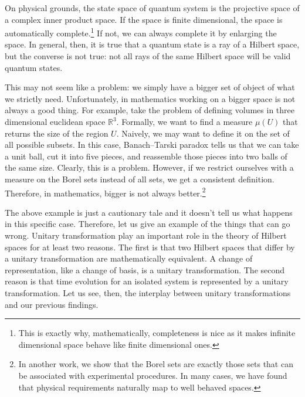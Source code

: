 \documentclass[10pt,twocolumn, nofootinbib]{revtex4-2}
\begin{document}
On physical grounds, the state space of quantum system is the projective space of a complex inner product space. If the space is finite dimensional, the space is automatically complete.\footnote{This is exactly why, mathematically, completeness is nice as it makes infinite dimensional space behave like finite dimensional ones.} If not, we can always complete it by enlarging the space. In general, then, it is true that a quantum state is a ray of a Hilbert space, but the converse is not true: not all rays of the same Hilbert space will be valid quantum states.

This may not seem like a problem: we simply have a bigger set of object of what we strictly need. Unfortunately, in mathematics working on a bigger space is not always a good thing. For example, take the problem of defining volumes in three dimensional euclidean space $\mathbb{R}^3$. Formally, we want to find a measure $\mu(U)$ that returns the size of the region $U$. Naively, we may want to define it on the set of all possible subsets. In this case, Banach–Tarski paradox tells us that we can take a unit ball, cut it into five pieces, and reassemble those pieces into two balls of the same size. Clearly, this is a problem. However, if we restrict ourselves with a measure on the Borel sets instead of all sets, we get a consistent definition. Therefore, in mathematics, bigger is not always better.\footnote{In another work, we show that the Borel sets are exactly those sets that can be associated with experimental procedures. In many cases, we have found that physical requirements naturally map to well behaved spaces.}

The above example is just a cautionary tale and it doesn't tell us what happens in this specific case. Therefore, let us give an example of the things that can go wrong. Unitary transformation play an important role in the theory of Hilbert spaces for at least two reasons. The first is that two Hilbert spaces that differ by a unitary transformation are mathematically equivalent. A change of representation, like a change of basis, is a unitary transformation. The second reason is that time evolution for an isolated system is represented by a unitary transformation. Let us see, then, the interplay between unitary transformations and our previous findings.
\end{document}
